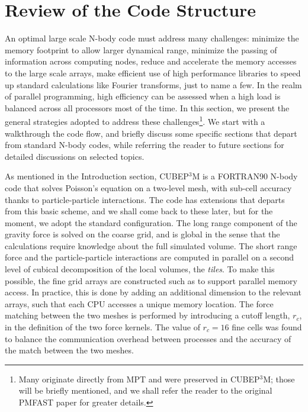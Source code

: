 \documentclass[useAMS,usenatbib]{mn2e}
\begin{document}
%

\section{Review of the Code Structure}
\label{sec:structure}


An optimal large scale N-body code must address many challenges: minimize the memory footprint to allow larger dynamical range,
minimize the passing of information across computing nodes, reduce and accelerate the memory accesses to the large scale arrays, 
make efficient use of high performance libraries to speed up standard calculations like Fourier transforms, just to name a few.
In the realm of parallel programming, high efficiency  can be assessed when a high load is balanced across all processors
most of the time. In this section, we present the general strategies adopted to address these challenges\footnote{ 
Many originate directly from MPT and were preserved in {\small CUBEP$^3$M};
those will be briefly mentioned, and we shall refer the reader to the original {\small PMFAST} paper for greater details.}.
We start with a walkthrough the code flow, and briefly discuss some specific sections that depart from standard N-body codes,
while referring the reader to future sections for detailed discussions on selected topics.


As mentioned in the Introduction section, {\small CUBEP$^3$M} is a {\small FORTRAN90} 
N-body code that solves Poisson's equation on a two-level mesh, 
with sub-cell accuracy thanks to particle-particle interactions. 
The code has extensions that departs from this basic scheme, and
we shall come back to these later, but for the moment, we adopt the 
standard configuration. 
The long range component of the gravity force is solved on the coarse grid, 
and is global in the sense that the calculations require knowledge about the full simulated volume.
The short range force and the particle-particle interactions are computed in parallel on
a second level of cubical decomposition of the local volumes, the {\it tiles}. To make this possible, the fine grid arrays are constructed such as to support parallel memory access. In practice, this is done by adding an additional dimension to the relevant arrays, such that each {\small CPU} accesses a unique memory location. The force matching between the two meshes is performed by introducing a cutoff length, $r_{c}$, in the definition of the two force kernels. The value of $r_{c}=16$ fine cells was found to balance the communication 
overhead between processes and the accuracy of the match between the two meshes. 
\end{document}
